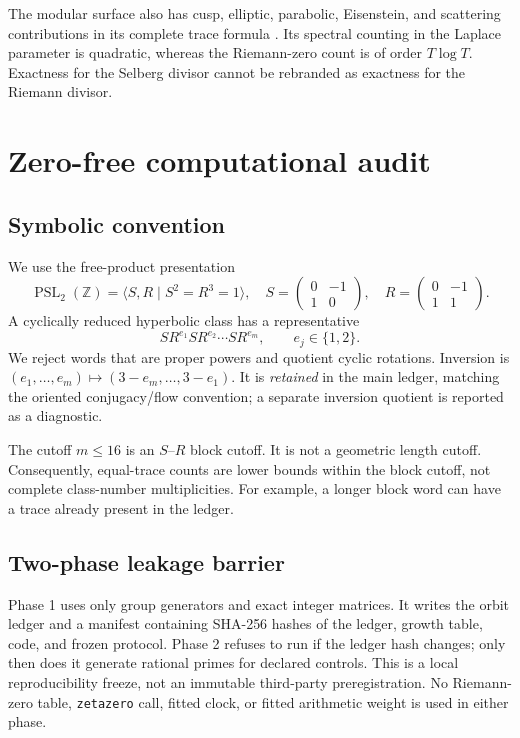 \documentclass[11pt]{article}
\theoremstyle{definition}
\theoremstyle{remark}
\newcommand{\PSL}{\operatorname{PSL}}
\newcommand{\Z}{\mathbb{Z}}
\begin{document}
The modular surface also has cusp, elliptic, parabolic, Eisenstein, and
scattering contributions in its complete trace formula
\citep{Hejhal1983,LuoSarnak1995}.  Its spectral counting in the Laplace
parameter is quadratic, whereas the Riemann-zero count is of order
\(T\log T\).  Exactness for the Selberg divisor cannot be rebranded as
exactness for the Riemann divisor.

\section{Zero-free computational audit}
\label{sec:experiment}

\subsection{Symbolic convention}

We use the free-product presentation
\[
 \PSL_2(\Z)=\langle S,R\mid S^2=R^3=1\rangle,
 \quad
 S=\begin{pmatrix}0&-1\\1&0\end{pmatrix},\quad
 R=\begin{pmatrix}0&-1\\1&1\end{pmatrix}.
\]
A cyclically reduced hyperbolic class has a representative
\[
 SR^{e_1}SR^{e_2}\cdots SR^{e_m},\qquad e_j\in\{1,2\}.
\]
We reject words that are proper powers and quotient cyclic rotations.
Inversion is \((e_1,\ldots,e_m)\mapsto(3-e_m,\ldots,3-e_1)\).  It is
\emph{retained} in the main ledger, matching the oriented conjugacy/flow
convention; a separate inversion quotient is reported as a diagnostic.

The cutoff \(m\le16\) is an \(S\)--\(R\) block cutoff.  It is not a geometric
length cutoff.  Consequently, equal-trace counts are lower bounds within the
block cutoff, not complete class-number multiplicities.  For example, a
longer block word can have a trace already present in the ledger.

\subsection{Two-phase leakage barrier}

Phase 1 uses only group generators and exact integer matrices.  It writes the
orbit ledger and a manifest containing SHA-256 hashes of the ledger, growth
table, code, and frozen protocol.  Phase 2 refuses to run if the ledger hash
changes; only then does it generate rational primes for declared controls.
This is a local reproducibility freeze, not an immutable third-party
preregistration.  No Riemann-zero table, \texttt{zetazero} call, fitted clock,
or fitted arithmetic weight is used in either phase.
\end{document}
